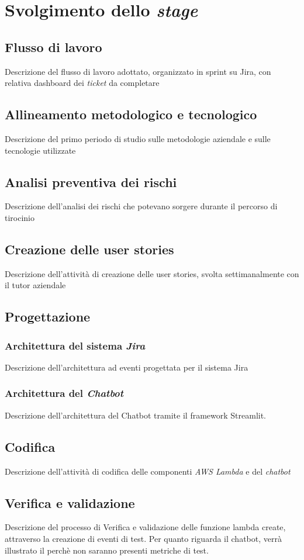 \chapter{Svolgimento dello \textit{stage}}
\label{cap:descrizione-stage}

\section{Flusso di lavoro}
Descrizione del flusso di lavoro adottato, organizzato in sprint su Jira, con relativa dashboard dei \textit{ticket} da completare
\section{Allineamento metodologico e tecnologico}
Descrizione del primo periodo di studio sulle metodologie aziendale e sulle tecnologie utilizzate
\section{Analisi preventiva dei rischi}
Descrizione dell'analisi dei rischi che potevano sorgere durante il percorso di tirocinio
\section{Creazione delle user stories}
Descrizione dell'attività di creazione delle user stories, svolta settimanalmente con il tutor aziendale
\section{Progettazione}
\subsection{Architettura del sistema \textit{Jira}}
Descrizione dell'architettura ad eventi progettata per il sistema Jira
\subsection{Architettura del \textit{Chatbot}}
Descrizione dell'architettura del Chatbot tramite il framework Streamlit.
\section{Codifica}
Descrizione dell'attività di codifica delle componenti \textit{AWS Lambda} e del \textit{chatbot}
\section{Verifica e validazione}
Descrizione del processo di Verifica e validazione delle funzione lambda create, attraverso la creazione di eventi di test.
Per quanto riguarda il chatbot, verrà illustrato il perchè non saranno presenti metriche di test.
